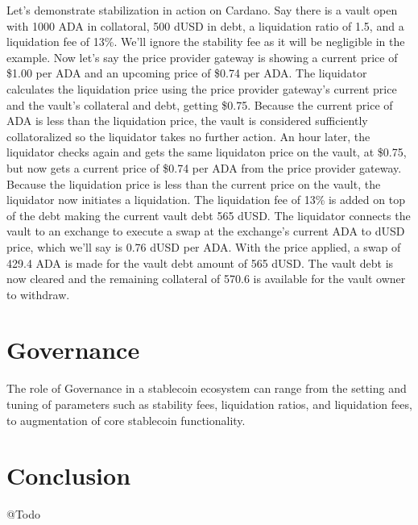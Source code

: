 \documentclass[12pt]{article}
\begin{document}
Let's demonstrate stabilization in action on Cardano. Say there is a vault open with 1000 ADA in collatoral, 500 dUSD in debt, a liquidation ratio of 1.5, and a liquidation fee of 13\%. We'll ignore the stability fee as it will be negligible in the example. Now let's say the price provider gateway is showing a current price of \$1.00 per ADA and an upcoming price of \$0.74 per ADA. The liquidator calculates the liquidation price using the price provider gateway's current price and the vault's collateral and debt, getting \$0.75. Because the current price of ADA is less than the liquidation price, the vault is considered sufficiently collatoralized so the liquidator takes no further action. An hour later, the liquidator checks again and gets the same liquidaton price on the vault, at \$0.75, but now gets a current price of \$0.74 per ADA from the price provider gateway. Because the liquidation price is less than the current price on the vault, the liquidator now initiates a liquidation. The liquidation fee of 13\% is added on top of the debt making the current vault debt 565 dUSD. The liquidator connects the vault to an exchange to execute a swap at the exchange's current ADA to dUSD price, which we'll say is 0.76 dUSD per ADA. With the price applied, a swap of 429.4 ADA is made for the vault debt amount of 565 dUSD. The vault debt is now cleared and the remaining collateral of 570.6 is available for the vault owner to withdraw.

\section{Governance}

The role of Governance in a stablecoin ecosystem can range from the setting and tuning of parameters such as stability fees, liquidation ratios, and liquidation fees, to augmentation of core stablecoin functionality.

\section{Conclusion}
\begin{flushleft}
	\color{red} @Todo
\end{flushleft}
\end{document}
